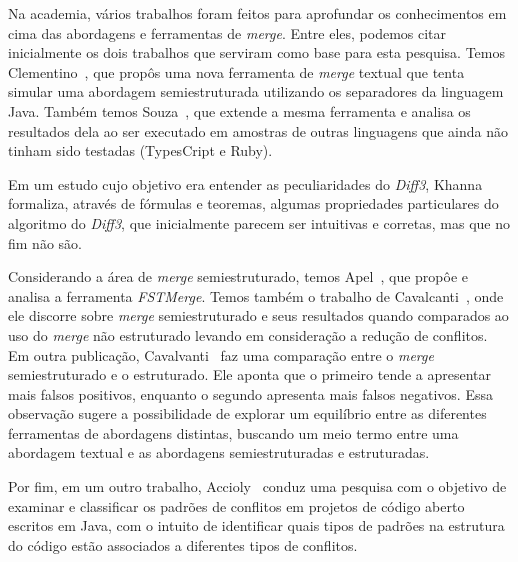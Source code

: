 Na academia, vários trabalhos foram feitos para aprofundar os conhecimentos em
cima das abordagens e ferramentas de \emph{merge}. Entre eles, podemos citar
inicialmente os dois trabalhos que serviram como base para esta pesquisa. Temos
Clementino~\cite{clem21}, que propôs uma nova ferramenta de \emph{merge}
textual que tenta simular uma abordagem semiestruturada utilizando os
separadores da linguagem Java. Também temos Souza~\cite{heitor21}, que extende
a mesma ferramenta e analisa os resultados dela ao ser executado em amostras de
outras linguagens que ainda não tinham sido testadas (TypesCript e Ruby).

Em um estudo cujo objetivo era entender as peculiaridades do \emph{Diff3},
Khanna~\cite{khan07} formaliza, através de fórmulas e teoremas, algumas
propriedades particulares do algoritmo do \emph{Diff3}, que inicialmente
parecem ser intuitivas e corretas, mas que no fim não são.

Considerando a área de \emph{merge} semiestruturado, temos Apel~\cite{apel11},
que propôe e analisa a ferramenta \emph{FSTMerge}. Temos também o trabalho de
Cavalcanti~\cite{cavalcanti17}, onde ele discorre sobre \emph{merge}
semiestruturado e seus resultados quando comparados ao uso do \emph{merge} não
estruturado levando em consideração a redução de conflitos. Em outra
publicação, Cavalvanti~\cite{cavalcanti19} faz uma comparação entre o
\emph{merge} semiestruturado e o estruturado. Ele aponta que o primeiro tende a
apresentar mais falsos positivos, enquanto o segundo apresenta mais falsos
negativos. Essa observação sugere a possibilidade de explorar um equilíbrio
entre as diferentes ferramentas de abordagens distintas, buscando um meio termo
entre uma abordagem textual e as abordagens semiestruturadas e estruturadas.

Por fim, em um outro trabalho, Accioly~\cite{accioly18} conduz uma pesquisa com
o objetivo de examinar e classificar os padrões de conflitos em projetos de
código aberto escritos em Java, com o intuito de identificar quais tipos de
padrões na estrutura do código estão associados a diferentes tipos de
conflitos.

